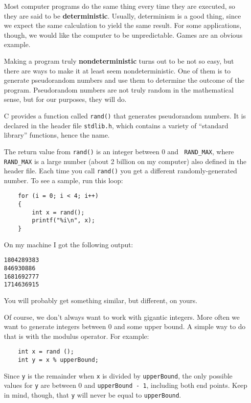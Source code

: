 Most computer programs do the same thing every time they are executed,
so they are said to be {\bf deterministic}.  Usually, determinism is a
good thing, since we expect the same calculation to yield the same
result.  For some applications, though, we would like the
computer to be unpredictable.  Games are an obvious example.

Making a program truly {\bf nondeterministic} turns out to be not
so easy, but there are ways to make it at least seem
nondeterministic.  One of them is to generate {pseudorandom} numbers and
use them to determine the outcome of the program.
Pseudorandom numbers
are not truly random in the mathematical sense, but 
for our purposes, they will do.


C provides a function called {\tt rand()} that generates
pseudorandom numbers.  It is declared in the
header file {\tt stdlib.h}, which contains a variety of ``standard
library'' functions, hence the name.

The return value from {\tt rand()} is an integer between 0 and {\tt
RAND\_MAX}, where {\tt RAND\_MAX} is a large number (about 2 billion
on my computer) also defined in the header file.  Each time you call
{\tt rand()} you get a different randomly-generated number.  To see a
sample, run this loop:

\begin{verbatim}
    for (i = 0; i < 4; i++) 
    {
        int x = rand();
        printf("%i\n", x);
    }
\end{verbatim}
%
On my machine I got the following output:

\begin{verbatim}
1804289383
846930886
1681692777
1714636915
\end{verbatim}
%
You will probably get something similar, but different, on yours.

Of course, we don't always want to work with gigantic integers.
More often we want to generate integers between 0 and some
upper bound.  A simple way to do that is with the modulus
operator.  For example:

\begin{verbatim}
    int x = rand ();
    int y = x % upperBound;
\end{verbatim}
%
Since {\tt y} is the remainder when {\tt x} is divided by
{\tt upperBound}, the only possible values for {\tt y}
are between 0 and {\tt upperBound - 1}, including both
end points.  Keep in mind, though, that {\tt y} will never
be equal to {\tt upperBound}.

